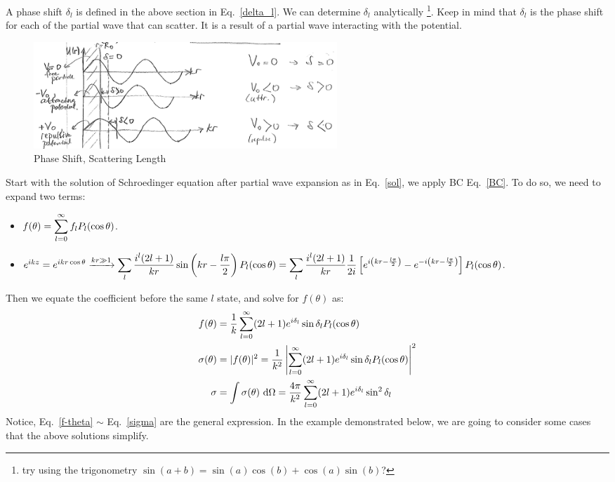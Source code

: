 \documentclass{school-22.101-notes}
\begin{document}
A phase shift $\delta_l$ is defined in the above section in Eq.~\ref{delta_l}. We can determine $\delta_l$ analytically \footnote{try using the trigonometry $\sin(a+b) = \sin(a) \cos (b) + \cos(a) \sin(b)$?}. Keep in mind that $\delta_l$ is the phase shift for each of the partial wave that can scatter. It is a result of a partial wave interacting with the potential.  
\begin{figure}[ht]
    \centering
    \includegraphics[width=4.5in]{images/scattering/scattering-potential-phase-shift.png}
    \caption{Phase Shift, Scattering Length }
\end{figure}

Start with the solution of Schroedinger equation after partial wave expansion as in Eq.~\ref{sol}, we apply BC Eq.~\ref{BC}. To do so, we need to expand two terms: 
\begin{itemize}
\item $ f(\theta) = \displaystyle\sum_{l=0}^{\infty} f_l P_l (\cos \theta)$.
\item $e^{ikz} = e^{ikr \cos \theta} \xrightarrow{kr \gg 1} \displaystyle\sum_l  \frac{i^l (2l+1)}{kr} \sin \left( kr - \frac{l \pi}{2} \right) P_l (\cos \theta) = \displaystyle\sum_l  \frac{i^l (2l+1)}{kr} \frac{1}{2i} \left[ e^{ i \left( kr - \frac{l \pi}{2} \right)} - e^{ -i \left( kr - \frac{l \pi}{2} \right)} \right] P_l (\cos \theta)$. 
\end{itemize}
Then we equate the coefficient before the same $l$ state, and solve for $f(\theta)$ as: 
\begin{align}
f(\theta) &= \frac{1}{k} \displaystyle\sum_{l=0}^{\infty} (2l+1) e^{i \delta_l} \sin \delta_l P_l (\cos \theta) \label{f-theta} \\
\sigma (\theta) &= |f(\theta)|^2 = \frac{1}{k^2} \left| \displaystyle\sum_{l=0}^{\infty} (2l+1) e^{i \delta_l} \sin \delta_l P_l (\cos \theta) \right|^2 \label{sigma-theta} \\
\sigma &= \int  \sigma(\theta) \mbox{ }\mathrm{d} \Omega= \frac{4 \pi}{k^2} \displaystyle\sum_{l=0}^{\infty} (2l+1) e^{i \delta_l} \sin^2 \delta_l  \label{sigma} 
\end{align}
Notice, Eq.~\ref{f-theta} $\sim$ Eq.~\ref{sigma} are the general expression. In the example demonstrated below, we are going to consider some cases that the above solutions simplify. 
\end{document}
